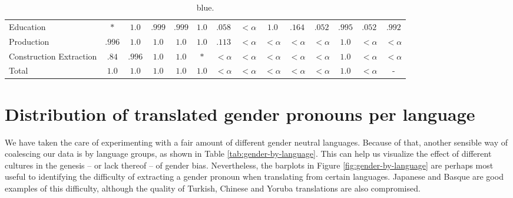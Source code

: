 \documentclass[fleqn,10pt]{article}
\begin{document}
\begin{table}[H]
\begin{tabular}{|m{1.75cm}|cccccccccccc|c|}
Education & $*$ & \cellcolor{blue!25}$1.0$ & \cellcolor{blue!25}$.999$ & \cellcolor{blue!25}$.999$ & \cellcolor{blue!25}$1.0$ & \cellcolor{blue!25}$.058$ & $<\alpha$ & \cellcolor{blue!25}$1.0$ & \cellcolor{blue!25}$.164$ & \cellcolor{blue!25}$.052$ & \cellcolor{blue!25}$.995$ & \cellcolor{blue!25}$.052$ & \cellcolor{blue!25}$.992$  \\ \cline{1-1} 
Production & \cellcolor{blue!25}$.996$ & \cellcolor{blue!25}$1.0$ & \cellcolor{blue!25}$1.0$ & \cellcolor{blue!25}$1.0$ & \cellcolor{blue!25}$1.0$ & \cellcolor{blue!25}$.113$ & $<\alpha$ & $<\alpha$ & $<\alpha$ & $<\alpha$ & \cellcolor{blue!25}$1.0$ & $<\alpha$ & $<\alpha$  \\ \cline{1-1} 
Construction 
 Extraction & \cellcolor{blue!25}$.84$ & \cellcolor{blue!25}$.996$ & \cellcolor{blue!25}$1.0$ & \cellcolor{blue!25}$1.0$ & $*$ & $<\alpha$ & $<\alpha$ & $<\alpha$ & $<\alpha$ & $<\alpha$ & \cellcolor{blue!25}$1.0$ & $<\alpha$ & $<\alpha$  \\ \cline{1-1} \hline
Total & \cellcolor{blue!25}$1.0$ & \cellcolor{blue!25}$1.0$ & \cellcolor{blue!25}$1.0$ & \cellcolor{blue!25}$1.0$ & \cellcolor{blue!25}$1.0$ & $<\alpha$ & $<\alpha$ & $<\alpha$ & $<\alpha$ & $<\alpha$ & \cellcolor{blue!25}$1.0$ & $<\alpha$ & -  \\ \hline
\end{tabular}
\caption{ \colorbox{blue!25}{blue}.}
\label{tab:pvalues-NF}
\end{table}

\section{Distribution of translated gender pronouns per language}

We have taken the care of experimenting with a fair amount of different gender neutral languages. Because of that, another sensible way of coalescing our data is by language groups, as shown in Table \ref{tab:gender-by-language}. This can help us visualize the effect of different cultures in the genesis -- or lack thereof -- of gender bias. Nevertheless, the barplots in Figure \ref{fig:gender-by-language} are perhaps most useful to identifying the difficulty of extracting a gender pronoun when translating from certain languages. Japanese and Basque are good examples of this difficulty, although the quality of Turkish, Chinese and Yoruba translations are also compromised.
\end{document}
